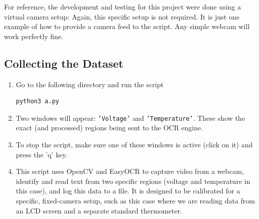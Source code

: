 For reference, the development and testing for this project were done using a virtual camera setup:
Again, this specific setup is not required. It is just one example of how to provide a camera feed to the script. Any simple webcam will work perfectly fine.
    
\fi

\subsection{Collecting the Dataset}\label{how-to-run}
\begin{enumerate}
\item Go to the following directory 
and 
    run the script
    \begin{lstlisting}[language=bash]
    python3 a.py
    \end{lstlisting}
    \item Two windows will appear: \texttt{'Voltage'} and \texttt{'Temperature'}. These show the exact (and processed) regions being sent to the OCR engine.
    \item To stop the script, make sure one of these windows is active (click on it) and {press the 'q' key}.
    \item This script uses OpenCV\cite{opencv_library} and EasyOCR\cite{easyocr} to capture video from a webcam, identify and read text from two specific regions (voltage and temperature in this case), and log this data to a file.
It is designed to be calibrated for a specific, fixed-camera setup, such as this case where we are reading data from an LCD screen and a separate standard thermometer.

\end{enumerate}
